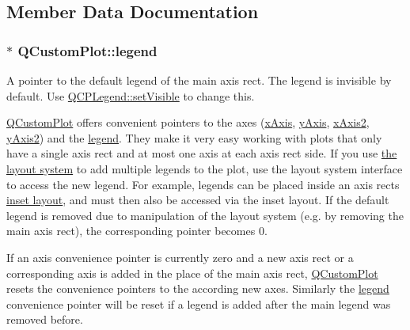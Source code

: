 \subsection{Member Data Documentation}
\subsubsection[{\texorpdfstring{legend}{legend}}]{ $\ast$ Q\+Custom\+Plot\+::legend}\hypertarget{classQCustomPlot_a4eadcd237dc6a09938b68b16877fa6af}{}\label{classQCustomPlot_a4eadcd237dc6a09938b68b16877fa6af}
A pointer to the default legend of the main axis rect. The legend is invisible by default. Use \hyperlink{classQCPLayerable_a3bed99ddc396b48ce3ebfdc0418744f8}{Q\+C\+P\+Legend\+::set\+Visible} to change this.

\hyperlink{classQCustomPlot}{Q\+Custom\+Plot} offers convenient pointers to the axes (\hyperlink{classQCustomPlot_a9a79cd0158a4c7f30cbc702f0fd800e4}{x\+Axis}, \hyperlink{classQCustomPlot_af6fea5679725b152c14facd920b19367}{y\+Axis}, \hyperlink{classQCustomPlot_ada41599f22cad901c030f3dcbdd82fd9}{x\+Axis2}, \hyperlink{classQCustomPlot_af13fdc5bce7d0fabd640f13ba805c0b7}{y\+Axis2}) and the \hyperlink{classQCustomPlot_a4eadcd237dc6a09938b68b16877fa6af}{legend}. They make it very easy working with plots that only have a single axis rect and at most one axis at each axis rect side. If you use \hyperlink{}{the layout system} to add multiple legends to the plot, use the layout system interface to access the new legend. For example, legends can be placed inside an axis rect\textquotesingle{}s \hyperlink{classQCPAxisRect_a4114887c7141b59650b7488f930993e5}{inset layout}, and must then also be accessed via the inset layout. If the default legend is removed due to manipulation of the layout system (e.\+g. by removing the main axis rect), the corresponding pointer becomes 0.

If an axis convenience pointer is currently zero and a new axis rect or a corresponding axis is added in the place of the main axis rect, \hyperlink{classQCustomPlot}{Q\+Custom\+Plot} resets the convenience pointers to the according new axes. Similarly the \hyperlink{classQCustomPlot_a4eadcd237dc6a09938b68b16877fa6af}{legend} convenience pointer will be reset if a legend is added after the main legend was removed before. 
